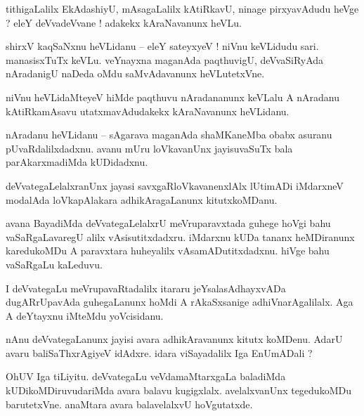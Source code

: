 \documentclass{article}
\begin{document}
\begin{mn}%
tithigaLalilx EkAdashiyU, mAsagaLalilx kAtiRkavU, ninage pirxyavAdudu heVge ? eleY deVvadeVvane ! 
adakekx kAraNavanunx heVLu.
\end{mn}

\begin{mn}%
shirxV kaqSaNxnu heVLidanu -- eleY sateyxyeV ! niVnu keVLidudu sari. manasisxTuTx keVLu. veYnayxna 
maganAda paqthuvigU, deVvaSiRyAda nAradanigU naDeda oMdu saMvAdavanunx heVLutetxVne.
\end{mn}

\begin{mn}%
niVnu heVLidaMteyeV hiMde paqthuvu nAradananunx keVLalu A nAradanu kAtiRkamAsavu utatxmavAdudakekx 
kAraNavanunx heVLidanu.
\end{mn}

\begin{mn}%
nAradanu heVLidanu -- sAgarava maganAda shaMKaneMba obabx asuranu pUvaRdalilxdadxnu. avanu mUru 
loVkavanUnx jayisuvaSuTx bala parAkarxmadiMda kUDidadxnu.
\end{mn}

\begin{mn}%
deVvategaLelalxranUnx jayasi savxgaRloVkavanenxlAlx lUtimADi iMdarxneV modalAda loVkapAlakara 
adhikAragaLanunx kitutxkoMDanu.
\end{mn}

\begin{mn}%
avana BayadiMda deVvategaLelalxrU meVruparavxtada guhege hoVgi bahu vaSaRgaLavaregU alilx 
vAsisutitxdadxru. iMdarxnu kUDa tananx heMDiranunx karedukoMDu A paravxtara huheyalilx 
vAsamADutitxdadxnu. hiVge bahu vaSaRgaLu kaLeduvu.
\end{mn}

\begin{mn}%
I deVvategaLu meVrupavaRtadalilx itararu jeYsalasAdhayxvADa dugARrUpavAda guhegaLanunx hoMdi A 
rAkaSxsanige adhiVnarAgalilalx. Aga A deYtayxnu iMteMdu yoVcisidanu.
\end{mn}

\begin{mn}%
nAnu deVvategaLanunx jayisi avara adhikAravanunx kitutx koMDenu. AdarU avaru baliSaThxrAgiyeV 
idAdxre. idara viSayadalilx Iga EnUmADali ?
\end{mn}

\begin{mn}%
OhUV Iga tiLiyitu. deVvategaLu veVdamaMtarxgaLa baladiMda kUDikoMDiruvudariMda avara balavu 
kugigxlalx. avelalxvanUnx tegedukoMDu barutetxVne. anaMtara avara balavelalxvU hoVgutatxde. 
\end{mn}
\end{document}
